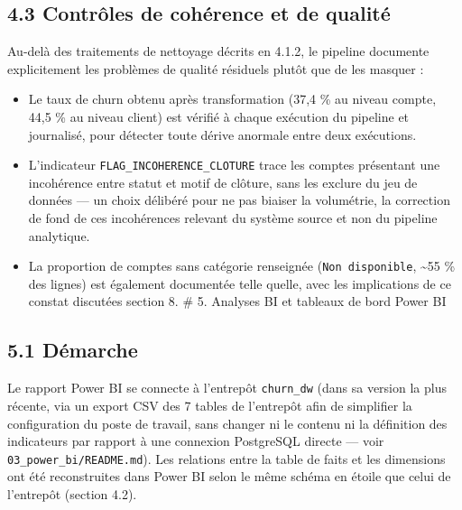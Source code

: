 \documentclass[11pt,a4paper]{article}
\providecommand{\tightlist}{\setlength{\itemsep}{0pt}\setlength{\parskip}{0pt}}
\begin{document}
\hypertarget{contruxf4les-de-cohuxe9rence-et-de-qualituxe9}{%
\subsection{4.3 Contrôles de cohérence et de
qualité}\label{contruxf4les-de-cohuxe9rence-et-de-qualituxe9}}

Au-delà des traitements de nettoyage décrits en 4.1.2, le pipeline
documente explicitement les problèmes de qualité résiduels plutôt que de
les masquer :

\begin{itemize}
\tightlist
\item
  Le taux de churn obtenu après transformation (37,4 \% au niveau
  compte, 44,5 \% au niveau client) est vérifié à chaque exécution du
  pipeline et journalisé, pour détecter toute dérive anormale entre deux
  exécutions.
\item
  L'indicateur
  \texttt{FLAG\_\hspace{0pt}INCOHERENCE\_\hspace{0pt}CLOTURE} trace les
  comptes présentant une incohérence entre statut et motif de clôture,
  sans les exclure du jeu de données --- un choix délibéré pour ne pas
  biaiser la volumétrie, la correction de fond de ces incohérences
  relevant du système source et non du pipeline analytique.
\item
  La proportion de comptes sans catégorie renseignée
  (\texttt{Non\ disponible}, \textasciitilde55 \% des lignes) est
  également documentée telle quelle, avec les implications de ce constat
  discutées section 8. \# 5. Analyses BI et tableaux de bord Power BI
\end{itemize}

\hypertarget{duxe9marche}{%
\subsection{5.1 Démarche}\label{duxe9marche}}

Le rapport Power BI se connecte à l'entrepôt
\texttt{churn\_\hspace{0pt}dw} (dans sa version la plus récente, via un
export CSV des 7 tables de l'entrepôt afin de simplifier la
configuration du poste de travail, sans changer ni le contenu ni la
définition des indicateurs par rapport à une connexion PostgreSQL
directe --- voir
\texttt{03\_\hspace{0pt}power\_\hspace{0pt}bi/\hspace{0pt}README.md}).
Les relations entre la table de faits et les dimensions ont été
reconstruites dans Power BI selon le même schéma en étoile que celui de
l'entrepôt (section 4.2).
\end{document}
